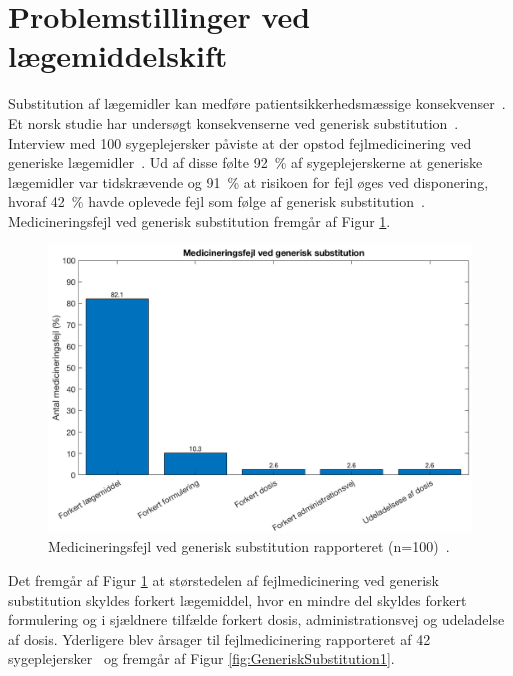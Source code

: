 \section{Problemstillinger ved lægemiddelskift}
Substitution af lægemidler kan medføre patientsikkerhedsmæssige konsekvenser~\citep{DanskSelskabforPatientsikkerhed2009}. Et norsk studie har undersøgt konsekvenserne ved generisk substitution~\citep{Hakonsen2010}. Interview med 100 sygeplejersker påviste at der opstod fejlmedicinering ved generiske lægemidler~\citep{Hakonsen2010}. Ud af disse følte 92~\% af sygeplejerskerne at generiske lægemidler var tidskrævende og 91~\% at risikoen for fejl øges ved disponering, hvoraf 42~\% havde oplevede fejl som følge af generisk substitution~\citep{Hakonsen2010}.
Medicineringsfejl ved generisk substitution fremgår af Figur \ref{fig:GeneriskSubstitution}.

\begin{figure}[H]\centering	\includegraphics[width=1\textwidth]{billeder/GenSub.png} 
	\caption{Medicineringsfejl ved generisk substitution rapporteret (n=100)~\citep{Hakonsen2010}.}
	\label{fig:GeneriskSubstitution}  
\end{figure}

Det fremgår af Figur \ref{fig:GeneriskSubstitution} at størstedelen af fejlmedicinering ved generisk substitution skyldes forkert lægemiddel, hvor en mindre del skyldes forkert formulering og i sjældnere tilfælde forkert dosis, administrationsvej og udeladelse af dosis. Yderligere blev årsager til fejlmedicinering rapporteret af 42 sygeplejersker~\citep{Hakonsen2010} og fremgår af Figur \ref{fig:GeneriskSubstitution1}.

